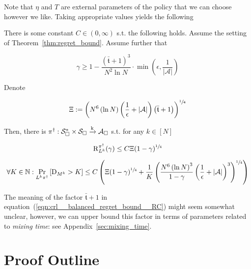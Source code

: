 \documentclass[anon,12pt]{colt2018} %
\newcommand{\AP}[1]{\left(#1\right)}
\newcommand{\AB}[1]{\left[#1\right]}
\newcommand{\Pa}[2]{\underset{#1}{\operatorname{Pr}}\AB{#2}}
\newcommand{\Nats}{\mathbb{N}}
\newcommand{\Abs}[1]{\left\vert #1 \right\vert}
\newcommand{\K}{\xrightarrow{\textnormal{k}}}
\newcommand{\A}{\mathcal{A}}
\newcommand{\St}{\mathcal{S}}
\newcommand{\Rg}{\operatorname{R}}
\newcommand{\MP}[2]{#1#2}
\newcommand{\Tn}{\mathfrak{t}}
\newcommand{\ND}{\operatorname{D}}
\newcommand{\RC}{\Xi}
\begin{document}
Note that $\eta$ and $T$ are external parameters of the policy that we can choose however we like. Taking appropriate values yields the following

\begin{samepage}
\begin{corollary}
\label{crl:balanced_regret_bound}

There is some constant $C \in (0,\infty)$ s.t. the following holds. Assume the setting of Theorem~\ref{thm:regret_bound}. Assume further that 

\begin{equation}
\gamma \geq 1 - \frac{\AP{\bar{\Tn}+1}^3}{N^2 \ln{N}}\cdot\min\AP{\epsilon,\frac{1}{\Abs{\A}}}
\end{equation}

Denote

\begin{equation}
\label{eqn:crl__balanced_regret_bound__RC}
\RC:=\AP{N^6 \AP{\ln N} \AP{\frac{1}{\epsilon}+\Abs{\A}}\AP{\bar{\Tn}+1}}^{\sfrac{1}{4}}
\end{equation}

Then, there is $\pi^\dagger: \St_\square^* \times \St_\square \K \A_\square$ s.t. for any $k\in[N]$

\begin{equation}
\label{eqn:crl__balanced_regret_bound__regret}
\Rg_{L^k}^{\pi^\dagger}(\gamma) \leq C\RC(1-\gamma)^{\sfrac{1}{4}}%
\end{equation}

\begin{equation}
\label{eqn:crl__balanced_regret_bound__delegations}
\forall K \in \Nats: \Pa{\MP{L^k}{\pi^\dagger}}{\ND_{M^k} > K} \leq C\AP{\Xi(1-\gamma)^{\sfrac{1}{4}}+\frac{1}{K}\AP{\frac{N^6\AP{\ln{N}}^3}{1-\gamma}\AP{\frac{1}{\epsilon}+\Abs{\A}}^3}^{\sfrac{1}{4}}}
\end{equation}

\end{corollary}
\end{samepage}

The meaning of the factor $\bar{\Tn}+1$ in equation~(\ref{eqn:crl__balanced_regret_bound__RC}) might seem somewhat unclear, however, we can upper bound this factor in terms of parameters related to \emph{mixing time}: see Appendix~\ref{sec:mixing_time}. 

\section{Proof Outline}
\end{document}
